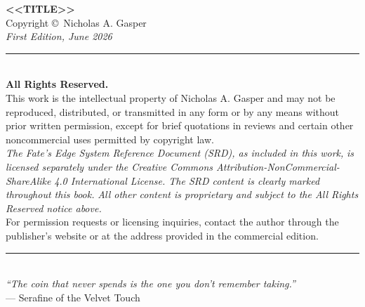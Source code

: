 \cleardoublepage
\thispagestyle{empty}
\begin{center}
  \vspace*{2in}
  {\LARGE\textbf{<<TITLE>>}}\\[0.3in]
  Copyright \copyright\ Nicholas A. Gasper\\[0.2in]
  \textit{First Edition, June 2026}\\[0.2in]

  \rule{0.6\textwidth}{0.4pt}\\[0.3in]

  \textbf{All Rights Reserved.}\\[0.1in]
  This work is the intellectual property of Nicholas A. Gasper and may not be reproduced,
  distributed, or transmitted in any form or by any means without prior written permission,
  except for brief quotations in reviews and certain other noncommercial uses permitted
  by copyright law.\\[0.2in]

  \textit{The Fate's Edge System Reference Document (SRD), as included in this work,}
  \textit{is licensed separately under the Creative Commons Attribution-NonCommercial-ShareAlike}
  \textit{4.0 International License. The SRD content is clearly marked throughout this book.}
  \textit{All other content is proprietary and subject to the All Rights Reserved notice above.}\\[0.2in]

  For permission requests or licensing inquiries, contact the author through the
  publisher's website or at the address provided in the commercial edition.\\[0.3in]

  \rule{0.5\textwidth}{0.4pt}\\[0.2in]
  \textit{``The coin that never spends is the one you don't remember taking.''}\\[0.1in]
  --- Serafine of the Velvet Touch
\end{center}
\newpage
\cleardoublepage
\thispagestyle{empty}
